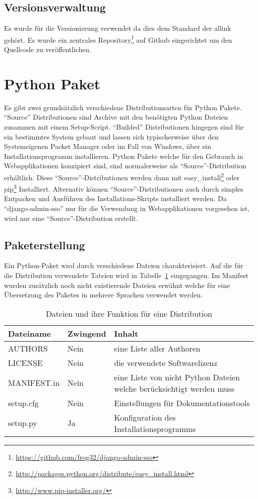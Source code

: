 \subsection{Versionsverwaltung}
\label{sub:versionsverwaltung}
Es wurde  für die Versionierung verwendet da dies dem Standard der allink gehört. Es wurde ein zentrales Repository\footnote{\url{https://github.com/frog32/django-admin-sso}} auf Github eingerichtet um den Quellcode zu veröffentlichen.

\section{Python Paket}
\label{sec:Python Paket}
Es gibt zwei grundsätzlich verschiedene Distributionsarten für Python Pakete. ``Source'' Distributionen sind Archive mit den benötigten Python Dateien zusammen mit einem Setup-Script. ``Builded'' Distributionen hingegen sind für ein bestimmtes System gebaut und lassen sich typischerweise über den Systemeigenen Packet Manager oder im Fall von Windows, über ein Installationsprogramm installieren. Python Pakete welche für den Gebrauch in Webapplikationen konzipiert sind, sind normalerweise als ``Source''-Distribution erhältlich. Diese ``Source''-Distributionen werden dann mit easy\_install\footnote{\url{http://packages.python.org/distribute/easy_install.html}} oder pip\footnote{\url{http://www.pip-installer.org/}} Installiert. Alternativ können ``Source''-Distributionen auch durch simples Entpacken und Ausführen des Installations-Skripts installiert werden. Da ``django-admin-sso'' nur für die Verwendung in Webapplikationen vorgesehen ist, wird nur eine ``Source''-Distribution erstellt.

\subsection{Paketerstellung}
\label{sub:paketerstellung}
Ein Python-Paket wird durch verschiedene Dateien charakterisiert. Auf die für die Distribution verwendete Tateien wird in Tabelle~\ref{tab:paket_inhalt} eingegangen. Im Manifest wurden zusätzlich noch nicht existierende Dateien erwähnt welche für eine Übersetzung des Paketes in mehrere Sprachen verwendet werden.

\begin{table}[ht]
  \centering
  \begin{tabular}{|l|l|p{7cm}|}
  \hline
  Dateiname & Zwingend & Inhalt\\
  \hline
  AUTHORS & Nein & eine Liste aller Authoren\\
  \hline
  LICENSE & Nein & die verwendete Softwarelizenz\\
  \hline
  MANIFEST.in & Nein & eine Liste von nicht Python Dateien welche berücksichtigt werden muss\\
  \hline
  setup.cfg & Nein & Einstellungen für Dokumentationstools\\
  \hline
  setup.py & Ja & Konfiguration des Installationsprogramms\\
  \hline
  \end{tabular}
  \label{tab:paket_inhalt}
  \caption{Dateien und ihre Funktion für eine Distribution}
\end{table}

